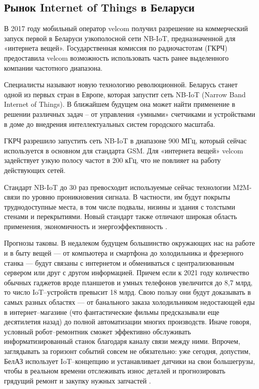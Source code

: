 \subsection{Рынок Internet of Things в Беларуси}
\label{sec:analysis:belarus}

В 2017 году мобильный оператор velcom получил разрешение на коммерческий запуск первой в Беларуси узкополосной сети NB-IoT, предназначенной для «интернета вещей». Государственная комиссия по радиочастотам (ГКРЧ) предоставила velcom возможность использовать часть ранее выделенного компании частотного диапазона.

Специалисты называют новую технологию революционной. Беларусь станет одной из первых стран в Европе, которая запустит сеть NB-IoT (Narrow Band Internet of Things). В ближайшем будущем она может найти применение в решении различных задач – от управления «умными» счетчиками и устройствами в доме до внедрения интеллектуальных систем городского масштаба.

ГКРЧ разрешило запустить сеть NB-IoT в диапазоне 900 МГц, который сейчас используется в основном для стандарта GSM. Для «интернета вещей» velcom задействует узкую полосу частот в 200 кГц, что не повлияет на работу действующих сетей.

Стандарт NB-IoT до 30 раз превосходит используемые сейчас технологии M2M-связи по уровню проникновения сигнала. В частности, им будут покрыты труднодоступные места, в том числе подвалы, низины и здания с толстыми стенами и перекрытиями. Новый стандарт также отличают широкая область применения, экономичность и энергоэффективность \cite{iot_belarus_velcom}.

Прогнозы таковы. В недалеком будущем большинство окружающих нас на работе и в быту вещей — от компьютера и смартфона до холодильника и фрезерного станка — будут связаны с интернетом и обмениваться с централизованным сервером или друг с другом информацией. Причем если к 2021 году количество обычных гаджетов вроде планшетов и умных телефонов увеличится до 8,7 млрд, то число IoT–устройств превысит 18 млрд. Свою пользу они будут доказывать в самых разных областях — от банального заказа холодильником недостающей еды в интернет–магазине (что фантастические фильмы предсказывали еще десятилетия назад) до полной автоматизации многих производств. Иначе говоря, условный робот–ремонтник сможет эффективно обслуживать информатизированный станок благодаря каналу связи между ними. Впрочем, заглядывать за горизонт событий совсем не обязательно: уже сегодня, допустим, БелАЗ использует IoT–концепцию и устанавливает датчики на свои большегрузы, чтобы в реальном времени отслеживать износ деталей и прогнозировать грядущий ремонт и закупку нужных запчастей \cite{iot_belarus_prog}.